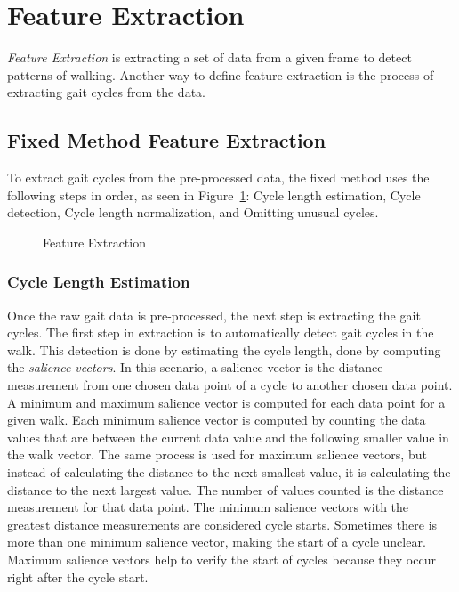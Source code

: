 \documentclass{sig-alternate}
\begin{document}
\section{Feature Extraction}
	\textit{Feature Extraction} is extracting a set of data from a given frame to detect patterns of walking. Another way to define feature extraction is the process of extracting gait cycles from the data. 		
\subsection{Fixed Method Feature Extraction}
	To extract gait cycles from the pre-processed data, the fixed method uses the following steps in order, as seen in Figure~\ref{fig:SecondStep}: Cycle length estimation, Cycle detection, Cycle length normalization, and Omitting unusual cycles. 
	
\begin{figure}
\centering
{}
\caption{Feature Extraction}
\label{fig:SecondStep}
\end{figure}

			
\subsubsection{Cycle Length Estimation}
	Once the raw gait data is pre-processed, the next step is extracting the gait cycles. The first step in extraction is to automatically detect gait cycles in the walk. This detection is done by estimating the cycle length, done by computing the \textit{salience vectors}. In this scenario, a salience vector is the distance measurement from one chosen data point of a cycle to another chosen data point. A minimum and maximum salience vector is computed for each data point for a given walk. Each minimum salience vector is computed by counting the data values that are between the current data value and the following smaller value in the walk vector. The same process is used for maximum salience vectors, but instead of calculating the distance to the next smallest value, it is calculating the distance to the next largest value. The number of values counted is the distance measurement for that data point. The minimum salience vectors with the greatest distance measurements are considered cycle starts. Sometimes there is more than one minimum salience vector, making the start of a cycle unclear. Maximum salience vectors help to verify the start of cycles because they occur right after the cycle start.
			
\end{document}
